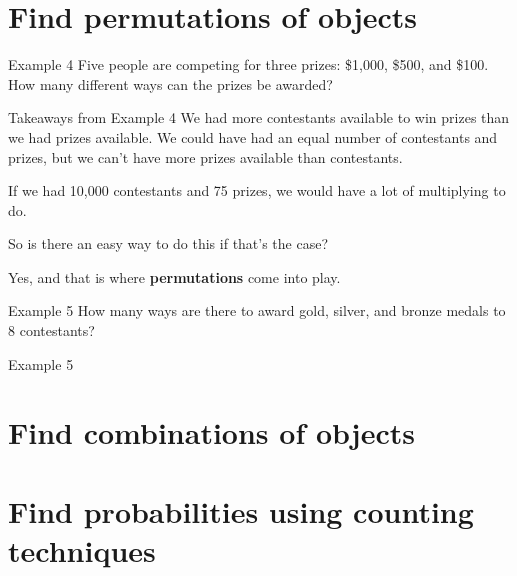 \documentclass[t]{beamer}
\begin{document}
\section{Find permutations of objects}

\begin{frame}{Example 4}
Five people are competing for three prizes: \$1,000, \$500, and \$100. How many different ways can the prizes be awarded?	\newline\\
\begin{center}
\end{center}
\end{frame}

\begin{frame}{Takeaways from Example 4}
We had more contestants available to win prizes than we had prizes available. We could have had an equal number of contestants and prizes, but we can't have more prizes available than contestants. \newline\\	\pause

If we had 10,000 contestants and 75 prizes, we would have a lot of multiplying to do.	\newline\\	\pause

So is there an easy way to do this if that's the case?	\newline\\	\pause

Yes, and that is where {\color{blue}\textbf{permutations}} come into play.
\end{frame}

\begin{frame}{Example 5}
How many ways are there to award gold, silver, and bronze medals to 8 contestants?	\newline\\
\begin{center}
\end{center}
\end{frame}

\begin{frame}{Example 5}

\end{frame}


\section{Find combinations of objects}
\section{Find probabilities using counting techniques}
\end{document}

